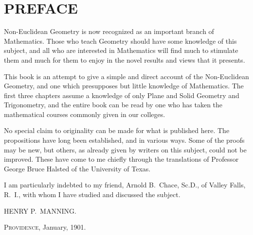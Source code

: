 \chapter{PREFACE}

Non-Euclidean Geometry is now recognized as an important branch of
Mathematics. Those who teach Geometry should have some knowledge of
this subject, and all who are interested in Mathematics will find
much to stimulate them and much for them to enjoy in the novel
results and views that it presents.

This book is an attempt to give a simple and direct account of the
Non-Euclidean Geometry, and one which presupposes but little
knowledge of Mathematics. The first three chapters assume a
knowledge of only Plane and Solid Geometry and Trigonometry, and the
entire book can be read by one who has taken the mathematical
courses commonly given in our colleges.

No special claim to originality can be made for what is published
here. The propositions have long been established, and in various
ways. Some of the proofs may be new, but others, as already given by
writers on this subject, could not be improved. These have come to
me chiefly through the translations of Professor George Bruce
Halsted of the University of Texas.

I am particularly indebted to my friend, Arnold B.~Chace, Sc.D., of
Valley Falls, R.~I., with whom I have studied and discussed the
subject.\medskip

\hfill HENRY P.~MANNING.

{\footnotesize \textsc{Providence}, January, 1901.}

\tableofcontents
\mainmatter
